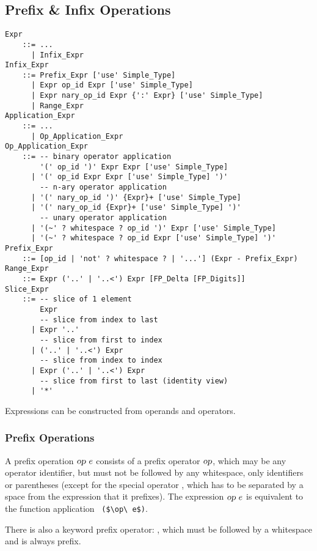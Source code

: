 \subsection{Prefix \& Infix Operations}
\label{sec:prefix-infix-ops}

\grammar\begin{lstlisting}
Expr
    ::= ...
      | Infix_Expr
Infix_Expr 
    ::= Prefix_Expr ['use' Simple_Type]
      | Expr op_id Expr ['use' Simple_Type]
      | Expr nary_op_id Expr {':' Expr} ['use' Simple_Type] 
      | Range_Expr
Application_Expr
    ::= ...
      | Op_Application_Expr
Op_Application_Expr
    ::= -- binary operator application
        '(' op_id ')' Expr Expr ['use' Simple_Type]
      | '(' op_id Expr Expr ['use' Simple_Type] ')'
        -- n-ary operator application
      | '(' nary_op_id ')' {Expr}+ ['use' Simple_Type]
      | '(' nary_op_id {Expr}+ ['use' Simple_Type] ')'
        -- unary operator application
      | '(~' ? whitespace ? op_id ')' Expr ['use' Simple_Type]
      | '(~' ? whitespace ? op_id Expr ['use' Simple_Type] ')'
Prefix_Expr 
    ::= [op_id | 'not' ? whitespace ? | '...'] (Expr - Prefix_Expr)
Range_Expr
    ::= Expr ('..' | '..<') Expr [FP_Delta [FP_Digits]]
Slice_Expr
    ::= -- slice of 1 element
        Expr 
        -- slice from index to last
      | Expr '..'
        -- slice from first to index
      | ('..' | '..<') Expr
        -- slice from index to index
      | Expr ('..' | '..<') Expr
        -- slice from first to last (identity view)
      | '*'
\end{lstlisting}

Expressions can be constructed from operands and operators. 





\subsubsection{Prefix Operations}

A prefix operation $\mbox{\sl op}\ e$ consists of a prefix operator $\mbox{\sl op}$, which may be any operator identifier, but must not be followed by any whitespace, only identifiers or parentheses (except for the special operator , which has to be separated by a space from the expression that it prefixes). The expression $\mbox{\sl op}\ e$ is equivalent to the function application ~\lstinline!($\op\ e$)!.

There is also a keyword prefix operator: , which must be followed by a whitespace and is always prefix.

